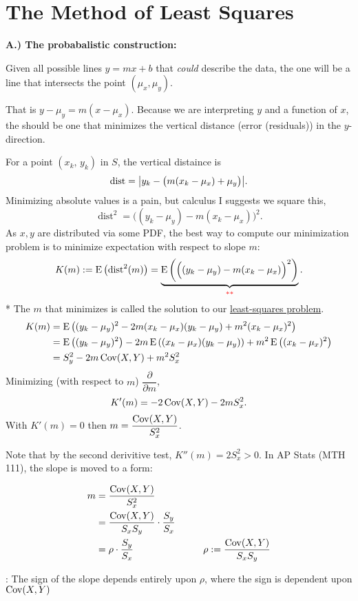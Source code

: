 \newpage
\section{The Method of Least Squares}
\nl\textbf{A.) The probabalistic construction:}

\nl Given all possible lines $y=mx+b$ that \textit{could} describe the data, the  one will be a line that intersects the point $(\mu_x, \mu_y)$.

\nl That is $y - \mu_y = m(x-\mu_x)$. Because we are interpreting $y$ and a function of $x$, the  should be one that minimizes the vertical distance (error (residuals)) in the $y$-direction.

\nl For a point $(x_k,\, y_k)$ in $S$, the vertical distaince is 
$$\text{dist} = \abs{y_k - \big(m(x_k - \mu_x) + \mu_y \big)}.$$
Minimizing absolute values is a pain, but calculus I suggests we square this,
$$\operatorname{dist}^2 = \Big((y_k-\mu_y) - m(x_k-\mu_x)\Big)^2.$$
As $x,y$ are distributed via some PDF, the best way to compute our minimization problem is to minimize expectation with respect to slope $m$:
$$K(m) := \E{\operatorname{dist}^2(m)} = \underbrace{\E{\Big((y_k-\mu_y) - m(x_k-\mu_x)\Big)^2}}_{\setRed **}.$$
\setRed ** \setBlack The $m$ that minimizes is called the solution to our \underline{least-squares problem}.
\begin{align*}
    K(m) &= \E{(y_k-\mu_y)^2  -2m(x_k-\mu_x)(y_k - \mu_y) + m^2(x_k-\mu_x)^2 }\\
    &= \E{(y_k-\mu_y)^2} -2m \E{(x_k-\mu_x)(y_k - \mu_y) } + m^2\E{(x_k-\mu_x)^2}\\
    &= S^2_y - 2m \Cov(X,Y) + m^2S^2_x
\end{align*}
Minimizing (with respect to $m$) $\dfrac{\partial}{\partial m}$,
$$K'(m) = -2 \operatorname{Cov}(X,Y) - 2mS^2_x.$$
With $K'(m) = 0$ then $m = \dfrac{\operatorname{Cov}(X,Y)}{S^2_x}$. 

\nl Note that by the second derivitive test, $K''(m) = 2S_x^2 > 0$. In AP Stats (MTH 111), the slope is moved to a  form:

\begin{align*}
    m &= \frac{\operatorname{Cov}(X,Y)}{S_x^2} \\
    &= \frac{\operatorname{Cov}(X,Y)}{S_x S_y} \cdot \frac{S_y}{S_x}\\
    &= \rho \cdot \frac{S_y}{S_x} \hspace{1in} \rho := \frac{\operatorname{Cov}(X,Y)}{S_xS_y}
\end{align*}

\nl {}: The sign of the slope depends entirely upon $\rho$, where the sign is dependent upon $\operatorname{Cov}(X,Y)$

